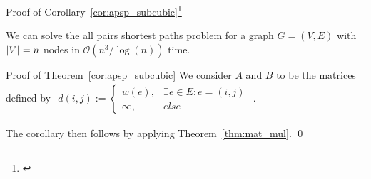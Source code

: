 \begin{frame}{Proof of Corollary~\ref{cor:apsp_subcubic}\footnote[1]{\cite[Corollary~3.3]{Chan2007}}}
    \setcounter{theorem}{3}
    \begin{corollary}
        We can solve the all pairs shortest paths problem for a graph $G = (V, E)$ with $\left\lvert V\right\rvert_{} = n$ nodes in $\mathcal{O}\left( n^3 / \log(n) \right)$ time.
    \end{corollary}
\end{frame}

\begin{frame}{Proof of Theorem~\ref{cor:apsp_subcubic}}
    We consider $A$ and $B$ to be the matrices defined by $\begin{aligned}d(i, j) := \begin{cases}
        w(e), &\exists e \in E: e = (i, j) \\
        \infty, &else
    \end{cases}\end{aligned}$.

    The corollary then follows by applying Theorem~\ref{thm:mat_mul}. \qed{}
\end{frame}